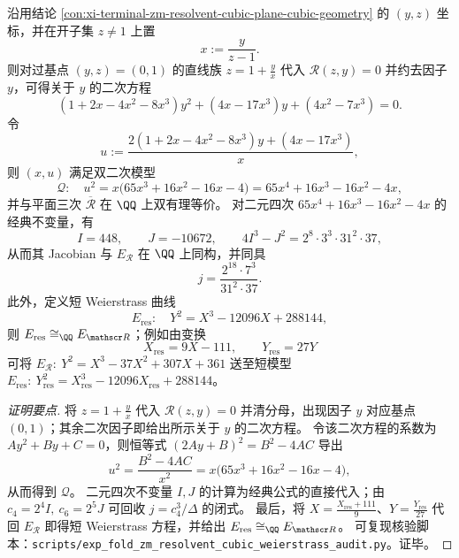 \begin{conclusion}\label{con:xi-terminal-zm-resolvent-cubic-biquadratic-invariants-short-weierstrass}
沿用结论 \ref{con:xi-terminal-zm-resolvent-cubic-plane-cubic-geometry} 的 \((y,z)\) 坐标，并在开子集 \(z\neq 1\) 上置
\[
x:=\frac{y}{z-1}.
\]
则对过基点 \((y,z)=(0,1)\) 的直线族 \(z=1+\frac{y}{x}\) 代入 \(\mathscr R(z,y)=0\) 并约去因子 \(y\)，可得关于 \(y\) 的二次方程
\[
(1+2x-4x^2-8x^3)y^2+(4x-17x^3)y+(4x^2-7x^3)=0.
\]
令
\[
u:=\frac{2(1+2x-4x^2-8x^3)y+(4x-17x^3)}{x},
\]
则 \((x,u)\) 满足双二次模型
\[
\mathcal Q:\quad
u^2=x\bigl(65x^3+16x^2-16x-4\bigr)
=65x^4+16x^3-16x^2-4x,
\]
并与平面三次 \(\overline{\mathcal R}\) 在 \(\QQ\) 上双有理等价。
对二元四次 \(65x^4+16x^3-16x^2-4x\) 的经典不变量，有
\[
I=448,\qquad J=-10672,\qquad 4I^3-J^2=2^8\cdot 3^3\cdot 31^2\cdot 37,
\]
从而其 Jacobian 与 \(E_{\mathscr R}\) 在 \(\QQ\) 上同构，并同具
\[
j=\frac{2^{18}\cdot 7^3}{31^2\cdot 37}.
\]
此外，定义短 Weierstrass 曲线
\[
E_{\mathrm{res}}:\quad Y^2=X^3-12096X+288144,
\]
则 \(E_{\mathrm{res}}\cong_{\QQ}E_{\mathscr R}\)；例如由变换
\[
X_{\mathrm{res}}=9X-111,\qquad Y_{\mathrm{res}}=27Y
\]
可将 \(E_{\mathscr R}:\ Y^2=X^3-37X^2+307X+361\) 送至短模型 \(E_{\mathrm{res}}:\ Y_{\mathrm{res}}^2=X_{\mathrm{res}}^3-12096X_{\mathrm{res}}+288144\)。
\end{conclusion}
\begin{proof}[证明要点]
将 \(z=1+\frac{y}{x}\) 代入 \(\mathscr R(z,y)=0\) 并清分母，出现因子 \(y\) 对应基点 \((0,1)\)；其余二次因子即给出所示关于 \(y\) 的二次方程。
令该二次方程的系数为 \(Ay^2+By+C=0\)，则恒等式 \((2Ay+B)^2=B^2-4AC\) 导出
\[
u^2=\frac{B^2-4AC}{x^2}=x\bigl(65x^3+16x^2-16x-4\bigr),
\]
从而得到 \(\mathcal Q\)。
二元四次不变量 \(I,J\) 的计算为经典公式的直接代入；由
\(
c_4=2^4I,\ c_6=2^5J
\)
可回收 \(j=c_4^3/\Delta\) 的闭式。
最后，将 \(X=\frac{X_{\mathrm{res}}+111}{9}\)、\(Y=\frac{Y_{\mathrm{res}}}{27}\) 代回 \(E_{\mathscr R}\) 即得短 Weierstrass 方程，并给出 \(E_{\mathrm{res}}\cong_{\QQ}E_{\mathscr R}\)。
可复现核验脚本：\texttt{scripts/exp\_fold\_zm\_resolvent\_cubic\_weierstrass\_audit.py}。证毕。
\end{proof}

